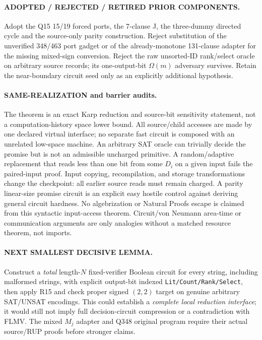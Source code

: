\documentclass[11pt]{article}
\begin{document}
\paragraph{ADOPTED / REJECTED / RETIRED PRIOR COMPONENTS.} Adopt the Q15 15/19 forced ports, the 7-clause J, the three-dummy directed cycle and the source-only parity construction. Reject substitution of the unverified 348/463 port gadget or of the already-monotone 131-clause adapter for the missing mixed-sign conversion. Reject the raw unsorted-ID rank/select oracle on arbitrary source records; its one-output-bit $\Omega(m)$ adversary survives. Retain the near-boundary circuit seed only as an explicitly additional hypothesis.

\paragraph{SAME-REALIZATION and barrier audits.} The theorem is an exact Karp reduction and source-bit sensitivity statement, not a computation-history space lower bound. All source/child accesses are made by one declared virtual interface; no separate fast circuit is composed with an unrelated low-space machine. An arbitrary SAT oracle can trivially decide the promise but is not an admissible uncharged primitive. A random/adaptive replacement that reads less than one bit from some $D_i$ on a given input fails the paired-input proof. Input copying, recompilation, and storage transformations change the checkpoint: all earlier source reads must remain charged. A parity linear-size promise circuit is an explicit easy hostile control against deriving general circuit hardness. No algebrization or Natural Proofs escape is claimed from this syntactic input-access theorem. Circuit/von Neumann area-time or communication arguments are only analogies without a matched resource theorem, not imports.

\paragraph{NEXT SMALLEST DECISIVE LEMMA.} Construct a \emph{total} length-$N$ fixed-verifier Boolean circuit for every string, including malformed strings, with explicit output-bit indexed \texttt{Lit/Count/Rank/Select}, then apply R15 and check proper signed $(2,2)$ target on genuine arbitrary SAT/UNSAT encodings. This could establish a \emph{complete local reduction interface}; it would still not imply full decision-circuit compression or a contradiction with FLMV. The mixed $M_j$ adapter and Q348 original program require their actual source/RUP proofs before stronger claims.
\end{document}
